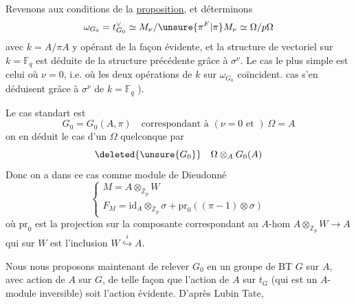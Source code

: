 Revenons aux conditions de la \uline{proposition}, et déterminons
\[
\omega_{G_0}=t_{G_0}^{\vee}\simeq M_\nu/\unsure{\pi^F|\pi}M_\nu\simeq\Omega/p\Omega
\]
avec $k=A/\pi A$ y opérant de la façon évidente, et la structure de vectoriel sur  $k=\mathbb F_q$ est déduite de la structure précédente grâce à $\sigma^\nu$. Le cas le plus simple est celui où $\nu=0$, i.e. où  les deux opérations de $k$ sur $\omega_{G_0}$ coïncident.   cas s'en déduisent grâce à  $\sigma^\nu$ de $k=\mathbb F_q$ \deleted{\unsure{$\sigma^\nu$}}).

Le cas standart est
\[
G_0=G_0(A,\pi)\quad\text{correspondant à }(\nu=0\text{ et })\ \Omega=A
\]
on en déduit le cas d'un $\Omega$ quelconque par
\[
\deleted{\unsure{G_0}}\quad\Omega\otimes_A G_0(A)
\]
Donc on a dans ce cas comme module de Dieudonné
\[
\begin{cases}
M=A\otimes_{\mathbb Z_p}W\\
F_M=\mathrm{id}_A\otimes_{\mathbb Z_p}\sigma+\mathrm{pr}_0((\pi-1)\otimes\sigma)
\end{cases}
\]
où $\mathrm{pr}_0$ est la projection sur la composante correspondant au $A$-hom $A\otimes_{\mathbb Z_p}W\longrightarrow A$ qui sur $W$ est l'inclusion $W\overset{i}{\hookrightarrow}A$.


Nous nous proposons maintenant de relever $G_0$  en un groupe de BT $G$ sur $A$, avec action de $A$ sur $G$, de telle façon que l'action  de $A$ sur $t_G$ (qui est un $A$-module inversible) soit l'action évidente. D'après Lubin Tate,
